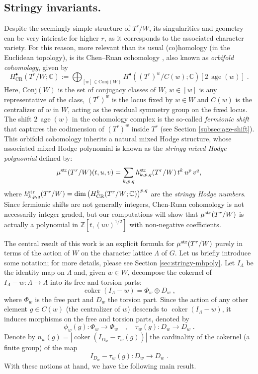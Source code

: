 \documentclass[11pt,english]{amsart}
\numberwithin{equation}{section}
\numberwithin{figure}{section}
\theoremstyle{plain}
\theoremstyle{plain}
\theoremstyle{definition}
\theoremstyle{remark}
\newcommand{\ZZ}{\mathbb{Z}}
\newcommand{\coker}{\operatorname{coker}}
\newcommand{\age}{\operatorname{age}}
\newcommand{\str}{\textup{str}}
\begin{document}
\subsection*{Stringy invariants.} Despite the seemingly simple structure of $T^r/W$, its singularities and geometry can be very intricate for higher $r$, as it corresponds to the associated character variety. For this reason, more relevant than its usual (co)homology (in the Euclidean topology), is its Chen--Ruan cohomology \cite{CR}, also known as \emph{orbifold cohomology}, given by
\begin{equation}\label{eq:CR-intro}
H^\bullet_{\text{CR}}(T^r/W; \mathbb{C}) := \bigoplus_{[w] \in \text{Conj}(W)} H^{\bullet}((T^r)^w / C(w); \mathbb{C})[2 \, \age(w)]\; .
\end{equation}
Here, $\text{Conj}(W)$ is the set of conjugacy classes of $W$, $w \in [w]$ is any representative of the class, $(T^r)^w$ is the locus fixed by $w\in W$ and $C(w)$ is the centralizer of $w$ in $W$, acting as the residual symmetry group on the fixed locus. The shift $2\,\age(w)$ in the cohomology complex is the so-called \emph{fermionic shift} \cite{fantechi2003orbifold} that captures the codimension of $(T^r)^w$ inside $T^r$ (see Section \ref{subsec:age-shift}). This orbifold cohomology inherits a natural mixed Hodge structure, whose associated mixed Hodge polynomial is known as the \emph{stringy mixed Hodge polynomial} defined by:
$$
\mu^{\str}(T^r/W)(t, u, v) = \sum_{k, p, q} h_{k,p,q}^\str(T^r/W)\, t^k\,u^p\,v^q,
$$
where $h_{k,p,q}^\str(T^r/W) = \dim \left(H^k_{\text{CR}}(T^r/W; \mathbb{C})\right)^{p,q}$ are the \emph{stringy Hodge numbers}. Since fermionic shifts are not generally integers, Chen-Ruan cohomology is not necessarily integer graded, but our computations will show that $\mu^{\str}(T^r/W)$ is actually a polynomial in $\ZZ[t,(uv)^{1/2}]$ with non-negative coefficients.

The central result of this work is an explicit formula for $\mu^{\str}(T^r/W)$ purely in terms of the action of $W$ on the character lattice $\Lambda$ of $G$. Let us briefly introduce some notation; for more details, please see Section \ref{sec:stringy-mhpoly}. Let $I_{\Lambda}$ be the identity map on $\Lambda$ and, given $w \in W$, decompose the cokernel of $I_{\Lambda}-w: \Lambda \to \Lambda$ into its free and torsion parts:
$$
    \coker(I_{\Lambda}-w) = \Phi_w \oplus D_w\; ,
$$
where $\Phi_w$ is the free part and $D_w$ the torsion part. Since the action of any other element  $g\in C(w)$ (the centralizer of $w$) descends to $\coker(I_{\Lambda}-w)$, it induces morphisms on the free and torsion parts, denoted by
$$
    \phi_w(g): \Phi_w \to \Phi_w\quad , \quad \tau_w(g): D_w \to D_w\; .
$$
Denote by $n_w(g) = |\coker(I_{D_w}-\tau_w(g))|$ the cardinality of the cokernel (a finite group) of the map 
$$I_{D_w}-\tau_w(g): D_w \to D_w\; .$$ 
With these notions at hand, we have the following main result.
\end{document}
